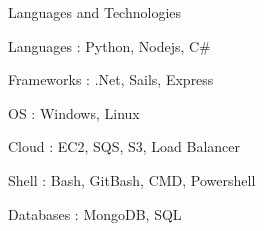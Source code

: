 

\begin{cventries}

  \cventry
    {Languages and Technologies}
    {}
    {}
    {}
    {
      \begin{cvitems} %
        \item {Languages : Python, Nodejs, C\#}
	\item {Frameworks : .Net, Sails, Express}	
	\item {OS : Windows, Linux}	
	\item {Cloud : EC2, SQS, S3, Load Balancer}	
	\item {Shell : Bash, GitBash, CMD, Powershell}	
	\item {Databases : MongoDB, SQL}	
      \end{cvitems}
    }

\end{cventries}
